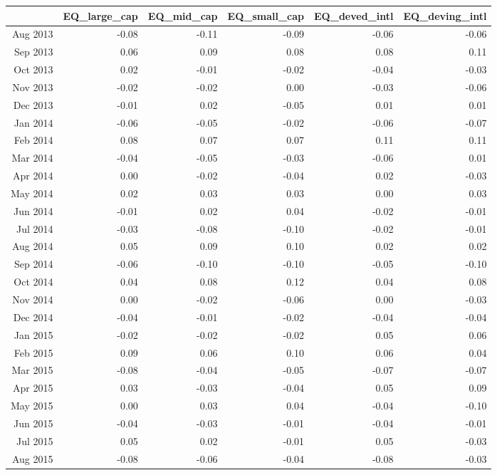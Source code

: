 \begin{tabularx}{\textwidth}{rrrrrr}
  \hline
 & EQ\_large\_cap & EQ\_mid\_cap & EQ\_small\_cap & EQ\_deved\_intl & EQ\_deving\_intl \\ 
  \hline
Aug 2013 & -0.08 & -0.11 & -0.09 & -0.06 & -0.06 \\ 
  Sep 2013 & 0.06 & 0.09 & 0.08 & 0.08 & 0.11 \\ 
  Oct 2013 & 0.02 & -0.01 & -0.02 & -0.04 & -0.03 \\ 
  Nov 2013 & -0.02 & -0.02 & 0.00 & -0.03 & -0.06 \\ 
  Dec 2013 & -0.01 & 0.02 & -0.05 & 0.01 & 0.01 \\ 
  Jan 2014 & -0.06 & -0.05 & -0.02 & -0.06 & -0.07 \\ 
  Feb 2014 & 0.08 & 0.07 & 0.07 & 0.11 & 0.11 \\ 
  Mar 2014 & -0.04 & -0.05 & -0.03 & -0.06 & 0.01 \\ 
  Apr 2014 & 0.00 & -0.02 & -0.04 & 0.02 & -0.03 \\ 
  May 2014 & 0.02 & 0.03 & 0.03 & 0.00 & 0.03 \\ 
  Jun 2014 & -0.01 & 0.02 & 0.04 & -0.02 & -0.01 \\ 
  Jul 2014 & -0.03 & -0.08 & -0.10 & -0.02 & -0.01 \\ 
  Aug 2014 & 0.05 & 0.09 & 0.10 & 0.02 & 0.02 \\ 
  Sep 2014 & -0.06 & -0.10 & -0.10 & -0.05 & -0.10 \\ 
  Oct 2014 & 0.04 & 0.08 & 0.12 & 0.04 & 0.08 \\ 
  Nov 2014 & 0.00 & -0.02 & -0.06 & 0.00 & -0.03 \\ 
  Dec 2014 & -0.04 & -0.01 & -0.02 & -0.04 & -0.04 \\ 
  Jan 2015 & -0.02 & -0.02 & -0.02 & 0.05 & 0.06 \\ 
  Feb 2015 & 0.09 & 0.06 & 0.10 & 0.06 & 0.04 \\ 
  Mar 2015 & -0.08 & -0.04 & -0.05 & -0.07 & -0.07 \\ 
  Apr 2015 & 0.03 & -0.03 & -0.04 & 0.05 & 0.09 \\ 
  May 2015 & 0.00 & 0.03 & 0.04 & -0.04 & -0.10 \\ 
  Jun 2015 & -0.04 & -0.03 & -0.01 & -0.04 & -0.01 \\ 
  Jul 2015 & 0.05 & 0.02 & -0.01 & 0.05 & -0.03 \\ 
  Aug 2015 & -0.08 & -0.06 & -0.04 & -0.08 & -0.03 \\ 

\end{tabularx}
